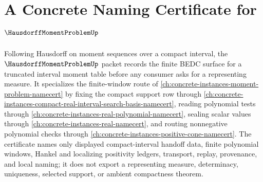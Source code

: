\chapter{A Concrete Naming Certificate for $\HausdorffMomentProblemUp$}
\label{ch:concrete-instances-hausdorff-moment-problem-namecert}

Following Hausdorff on moment sequences over a compact interval, the $\HausdorffMomentProblemUp$ packet records the finite BEDC surface for a truncated interval moment table before any consumer asks for a representing measure. It specializes the finite-window route of \autoref{ch:concrete-instances-moment-problem-namecert} by fixing the compact support row through \autoref{ch:concrete-instances-compact-real-interval-search-basis-namecert}, reading polynomial tests through \autoref{ch:concrete-instances-real-polynomial-namecert}, sealing scalar values through \autoref{ch:concrete-instances-real-namecert}, and routing nonnegative polynomial checks through \autoref{ch:concrete-instances-positive-cone-namecert}. The certificate names only displayed compact-interval handoff data, finite polynomial windows, Hankel and localizing positivity ledgers, transport, replay, provenance, and local naming; it does not export a representing measure, determinacy, uniqueness, selected support, or ambient compactness theorem.

